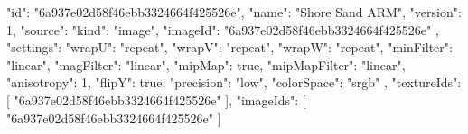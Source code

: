 {
  "id": "6a937e02d58f46ebb3324664f425526e",
  "name": "Shore Sand ARM",
  "version": 1,
  "source": {
    "kind": "image",
    "imageId": "6a937e02d58f46ebb3324664f425526e"
  },
  "settings": {
    "wrapU": "repeat",
    "wrapV": "repeat",
    "wrapW": "repeat",
    "minFilter": "linear",
    "magFilter": "linear",
    "mipMap": true,
    "mipMapFilter": "linear",
    "anisotropy": 1,
    "flipY": true,
    "precision": "low",
    "colorSpace": "srgb"
  },
  "textureIds": [
    "6a937e02d58f46ebb3324664f425526e"
  ],
  "imageIds": [
    "6a937e02d58f46ebb3324664f425526e"
  ]
}
